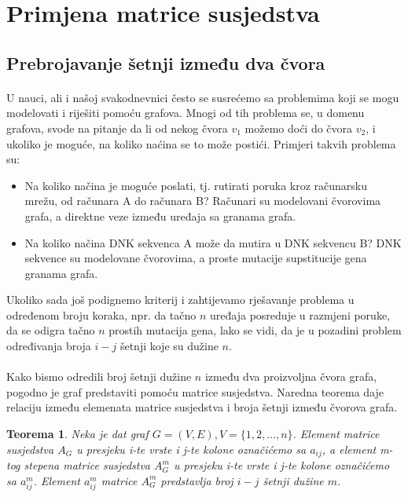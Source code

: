 \documentclass[11pt]{article}
\newtheorem{theorem}{Teorema}
\begin{document}
	\section{Primjena matrice susjedstva}
	\subsection{Prebrojavanje šetnji između dva čvora}
		\paragraph{}
		U nauci, ali i našoj svakodnevnici često se susrećemo sa problemima koji se mogu modelovati i riješiti pomoću grafova. 
		Mnogi od tih problema se, u domenu grafova, svode na pitanje da li od nekog čvora $v_1$ možemo doći do čvora $v_2$, i ukoliko je moguće, na koliko naćina se to može postići. Primjeri takvih problema su:
				\begin{itemize}
				\item Na koliko načina je moguće poslati, tj. rutirati poruka kroz računarsku mrežu, od računara A do računara B? Računari su modelovani čvorovima grafa, a direktne veze između uređaja sa granama grafa.
				\item Na koliko načina DNK sekvenca A može da mutira u DNK sekvencu B? DNK sekvence su modelovane čvorovima, a proste mutacije supstitucije gena granama grafa. 
				\end{itemize}
	
		Ukoliko sada još podignemo kriterij i zahtijevamo rješavanje problema u određenom broju koraka, npr. da tačno $n$ uređaja posreduje u razmjeni poruke, 
		da se odigra tačno $n$ prostih mutacija gena, lako se vidi, da je u pozadini problem određivanja broja $i-j$ šetnji koje su dužine $n$.
	
		\paragraph{}
		Kako bismo odredili broj šetnji dužine $n$ između dva proizvoljna čvora grafa, pogodno je graf predstaviti pomoću matrice susjedstva. 
		Naredna teorema daje relaciju između elemenata matrice susjedstva i broja šetnji između čvorova grafa.
	
		\begin{theorem}
			Neka je dat graf $G = (V, E), V = \{1, 2, \dots, n\}$. Element matrice susjedstva $A_G$ u presjeku i-te vrste i j-te kolone označićemo sa $a_{ij}$, 
			a element m-tog stepena matrice susjedstva $A_G^m$ u presjeku i-te vrste i j-te kolone označićemo sa $a_{ij}^m$. Element $a_{ij}^m$ matrice $A_G^m$ predstavlja broj $i-j$ šetnji dužine $m$. 
		\end{theorem}
		
\end{document}
